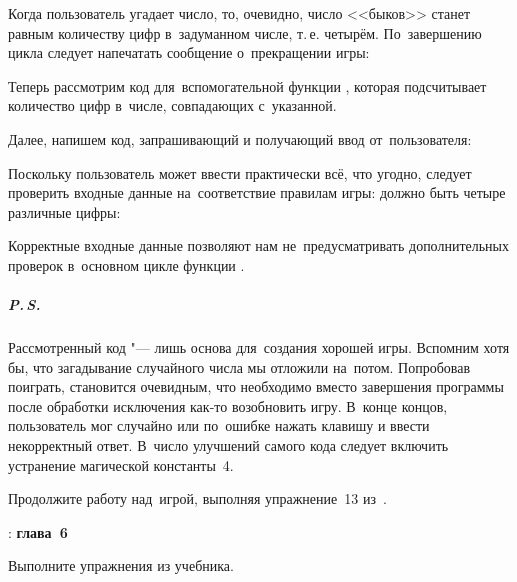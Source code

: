 
Когда пользователь угадает число, то, очевидно, число <<быков>> станет равным количеству цифр в~задуманном числе, т.\,е. четырём. По~завершению цикла следует напечатать сообщение о~прекращении игры:


Теперь рассмотрим код для~вспомогательной функции , которая подсчитывает количество цифр в~числе, совпадающих с~указанной.


Далее, напишем код, запрашивающий и получающий ввод от~пользователя:


Поскольку пользователь может ввести практически всё, что угодно, следует проверить входные данные на~соответствие правилам игры: должно быть четыре различные цифры:


Корректные входные данные позволяют нам не~предусматривать дополнительных проверок в~основном цикле функции .



\subparagraph{P.\,S.}
Рассмотренный код "--- лишь основа для~создания хорошей игры. Вспомним хотя бы, что загадывание случайного числа мы отложили на~потом. Попробовав поиграть, становится очевидным, что необходимо вместо завершения программы после обработки исключения как-то возобновить игру. В~конце концов, пользователь мог случайно или по~ошибке нажать клавишу и ввести некорректный ответ. В~число улучшений самого кода следует включить устранение магической константы~4.

Продолжите работу над~игрой, выполняя упражнение~13 из~.



\WhatToReadSection
\textcite{Stroustrup:2016:ru}: \textbf{глава~6}



\ExercisesSection
\begin{exercise}
\item Выполните упражнения из  учебника.
\end{exercise}
